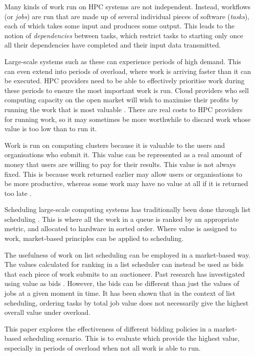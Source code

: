 \documentclass[english,british]{IEEEtran}
\begin{document}
Many kinds of work run on HPC systems are not independent. Instead,
workflows (or \emph{jobs}) are run that are made up of several individual
pieces of software (\emph{tasks}), each of which takes some input
and produces some output. This leads to the notion of \emph{dependencies}
between tasks, which restrict tasks to starting only once all their
dependencies have completed and their input data transmitted.

Large-scale systems such as these can experience periods of high demand.
This can even extend into periods of overload, where work is arriving
faster than it can be executed. HPC providers need to be able to effectively
prioritise work during these periods to ensure the most important
work is run. Cloud providers who sell computing capacity on the open
market will wish to maximise their profits by running the work that
is most valuable \cite{cloudintro11}. There are real costs to HPC
providers for running work, so it may sometimes be more worthwhile
to discard work whose value is too low than to run it.

Work is run on computing clusters because it is valuable to the users
and organisations who submit it. This value can be represented as
a real amount of money that users are willing to pay for their results.
This value is not always fixed. This is because work returned earlier
may allow users or organisations to be more productive, whereas some
work may have no value at all if it is returned too late \cite{aburkimsherEngD14}.

Scheduling large-scale computing systems has traditionally been done
through list scheduling \cite{graham69,Maheswaran99}. This is where
all the work in a queue is ranked by an appropriate metric, and allocated
to hardware in sorted order. Where value is assigned to work, market-based
principles can be applied to scheduling.

The usefulness of work on list scheduling can be employed in a market-based
way. The values calculated for ranking in a list scheduler can instead
be used as bids that each piece of work submits to an auctioneer.
Past research has investigated using value as bids \cite{irwin04}.
However, the bids can be different than just the values of jobs at
a given moment in time. It has been shown \cite{aburkimsherEngD14}
that in the context of list scheduling, ordering tasks by total job
value does not necessarily give the highest overall value under overload.

This paper explores the effectiveness of different bidding policies
in a market-based scheduling scenario. This is to evaluate which provide
the highest value, especially in periods of overload when not all
work is able to run.
\end{document}
